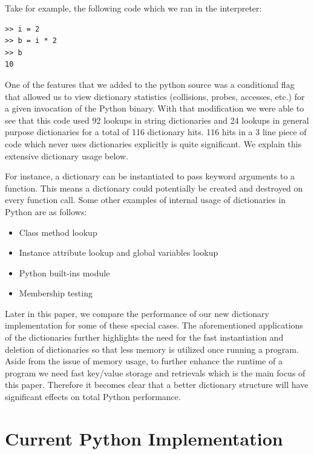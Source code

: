 \documentclass[11pt]{article}
\begin{document}
Take for example, the following code which we ran in the interpreter:

\begin{verbatim}
>> i = 2 
>> b = i * 2
>> b
10
\end{verbatim}

One of the features that we added to the python source was a conditional flag
that allowed us to view dictionary statistics (collisions, probes, accesses,
etc.) for a given invocation of the Python binary.  With that modification we
were able to see that this code used 92 lookups in string dictionaries and 24
lookups in general purpose dictionaries for a total of 116 dictionary hits. 116
hits in a 3 line piece of code which never uses dictionaries explicitly is quite
significant.  We explain this extensive dictionary usage below.

For instance, a dictionary can be instantiated to pass keyword arguments to a
function. This means a dictionary could potentially be created and destroyed on
every function call.  Some other examples of internal usage of dictionaries in
Python are as follows:

\begin{itemize}
\item Class method lookup
\item Instance attribute lookup and global variables lookup
\item Python built-ins module
\item Membership testing
\end{itemize}

Later in this paper, we compare the performance of our new dictionary
implementation for some of these special cases. The aforementioned applications
of the dictionaries further highlights the need for the fast instantiation and
deletion of dictionaries so that less memory is utilized once running a program.
Aside from the issue of memory usage, to further enhance the runtime of a
program we need fast key/value storage and retrievals which is the main focus of
this paper. Therefore it becomes clear that a better dictionary structure will
have significant effects on total Python performance.

\section{Current Python Implementation}
\end{document}
